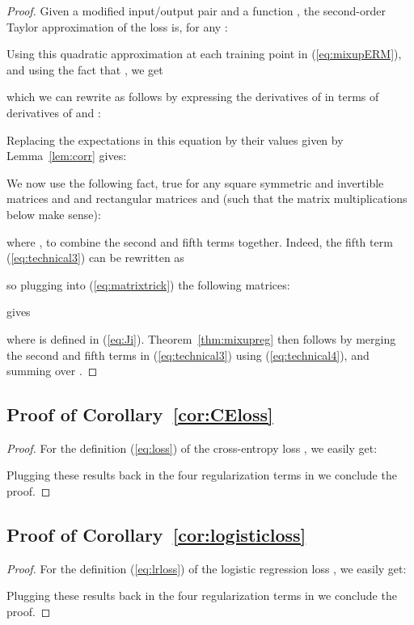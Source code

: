 \documentclass[twoside,11pt]{article}
\begin{document}
\begin{proof}
Given a modified input/output pair  and a function , the second-order Taylor approximation of the loss  is, for any :

Using this quadratic approximation at each training point  in (\ref{eq:mixupERM}), and using the fact that , we get

which we can rewrite as follows by expressing the derivatives of  in terms of derivatives of  and :

Replacing the expectations in this equation by their values given by Lemma~\ref{lem:corr} gives:

We now use the following fact, true for any square symmetric and invertible matrices  and  and rectangular matrices  and  (such that the matrix multiplications below make sense):

where , to combine the second and fifth terms together. Indeed, the fifth term (\ref{eq:technical3}) can be rewritten as

so plugging into (\ref{eq:matrixtrick}) the following matrices:

gives

where  is defined in (\ref{eq:Ji}).
Theorem~\ref{thm:mixupreg} then follows by merging the second and fifth terms in (\ref{eq:technical3}) using (\ref{eq:technical4}), and summing over .
\end{proof}

\subsection{Proof of Corollary~\ref{cor:CEloss}}

\begin{proof}
For the definition (\ref{eq:loss}) of the cross-entropy loss , we easily get:

Plugging these results back in the four regularization terms in  we conclude the proof.
\end{proof}

\subsection{Proof of Corollary~\ref{cor:logisticloss}}

\begin{proof}
For the definition (\ref{eq:lrloss}) of the logistic regression loss , we easily get:

Plugging these results back in the four regularization terms in  we conclude the proof.
\end{proof}
\end{document}
